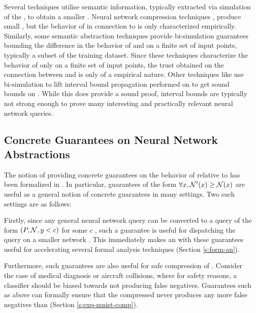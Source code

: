 Several techniques utilise semantic information, typically extracted via
simulation of the \dnn, to obtain a smaller \abs. 
Neural network compression techniques \cite{dnn-compression}, produce small
\abs, but the
behavior of \abs in connection to \cnc is only characterized empirically.
Similarly, some semantic abstraction techniques \cite{lin-comb-abs-jan} provide
bi-simulation guarantees bounding the difference in the behavior of \abs and
\cnc on a finite set of input points, typically a subset of the training
dataset. Since these techniques characterize the behavior of \abs only on a
finite set of
input points, the trust obtained on the connection between \cnc and \abs is only
of a empirical nature.
Other techniques like \cite{deep-abstract} use bi-simulation to lift
interval bound propagation performed on \abs to get sound bounds on \cnc. While
this does provide a sound proof, interval bounds are typically not strong enough
to prove many interesting and practically relevant neural network queries.

\subsection{Concrete Guarantees on Neural Network Abstractions}
\label{s:conc-abs}

The notion of providing concrete guarantees on the behavior of \abs relative to
\cnc has been formalized in \cite{cegar-nn}. In particular, guarantees of the
form $\forall x, \mathcal{N'}(x) \geq \mathcal{N}(x)$ are useful as a general notion of concrete
guarantees in many settings. Two such settings are as follows: 

Firstly, since any general neural network query can be converted to a query of
the form $(P, \mathcal{N}, y < c)$ for some $c$ \cite{cegar-nn, reluplex,
lipschitz-reach} , such a guarantee is
useful for dispatching the query on a smaller network \cite{cegar-nn, cegarette,
cleverest-nn}. This immediately makes an \abs with these guarantees useful for
accelerating several formal analysis techniques (Section \ref{s:form-an}).

Furthermore, such guarantees are also useful for safe compression of \dnn.
Consider the case of medical diagnosis \cite{b1} or aircraft
collisions\cite{acasxu}, where
for safety reasons, a classifier should be biased towards not producing false
negatives. Guarantees such as above can formally ensure that the compressed \abs
never produces any more false negatives than \cnc (Section
\ref{s:exp-mnist-comp}).

